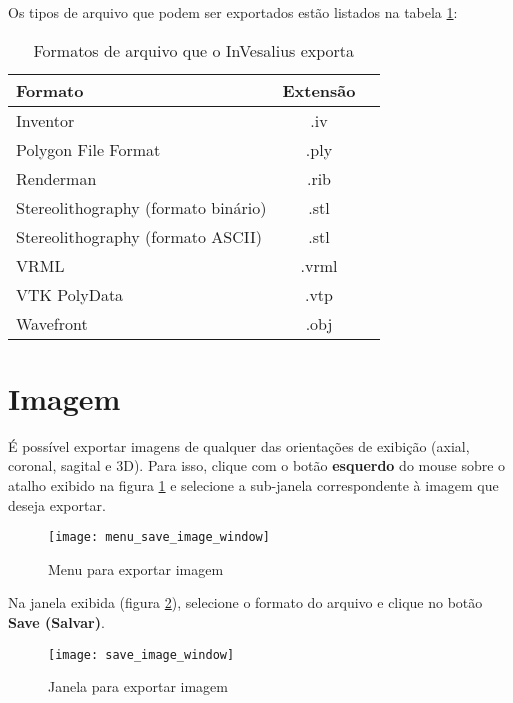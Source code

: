 Os tipos de arquivo que podem ser exportados estão listados na tabela
\ref{tab:files_export_list}:

\begin{table}[h]
\centering
\caption{Formatos de arquivo que o InVesalius exporta}
\begin{tabular}{lcc}\\
\hline %
Formato & Extensão\\
\hline
\hline
Inventor & .iv\\
Polygon File Format & .ply\\
Renderman & .rib\\
Stereolithography (formato binário)& .stl\\
Stereolithography (formato ASCII) & .stl\\
VRML & .vrml\\
VTK PolyData & .vtp\\
Wavefront & .obj\\
\hline
\end{tabular}
\label{tab:files_export_list}
\end{table} 


\section{Imagem}

É possível exportar imagens de qualquer das orientações de exibição (axial, coronal,
sagital e 3D). Para isso, clique com o botão \textbf{esquerdo} do mouse sobre o atalho
exibido na figura \ref{fig:menu_save_image_window} e selecione a sub-janela correspondente
à imagem que deseja exportar.

\begin{figure}[!htb]
\centering
\texttt{[image: menu\_save\_image\_window]}
\caption{Menu para exportar imagem}
\label{fig:menu_save_image_window}
\end{figure}

Na janela exibida (figura \ref{fig:save_image_window}), selecione o formato do arquivo e
clique no botão \textbf{Save (Salvar)}.

\begin{figure}[!htb]
\centering
\texttt{[image: save\_image\_window]}
\caption{Janela para exportar imagem}
\label{fig:save_image_window}
\end{figure}
